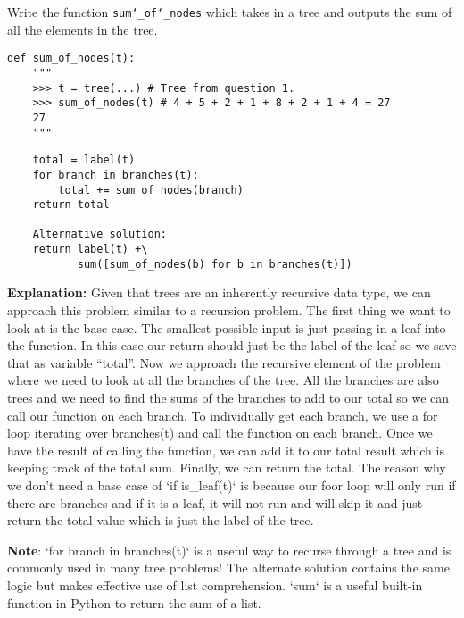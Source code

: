 \begin{blocksection}
\question Write the function \texttt{sum\char`_of\char`_nodes} which takes in a
tree and outputs the sum of all the elements in the tree.
\end{blocksection}

\begin{lstlisting}
def sum_of_nodes(t):
    """
    >>> t = tree(...) # Tree from question 1.
    >>> sum_of_nodes(t) # 4 + 5 + 2 + 1 + 8 + 2 + 1 + 4 = 27
    27
    """
\end{lstlisting}
\begin{solution}
\begin{lstlisting}
    total = label(t)
    for branch in branches(t):
        total += sum_of_nodes(branch)
    return total

    Alternative solution:
    return label(t) +\
           sum([sum_of_nodes(b) for b in branches(t)])
\end{lstlisting}
\textbf{Explanation:}
Given that trees are an inherently recursive data type, we can approach this problem similar to a recursion problem. The first thing we want to look at is the base case. The smallest possible input is just passing in a leaf into the function. In this case our return should just be the label of the leaf so we save that as variable “total”. Now we approach the recursive element of the problem where we need to look at all the branches of the tree. All the branches are also trees and we need to find the sums of the branches to add to our total so we can call our function on each branch. To individually get each branch, we use a for loop iterating over branches(t) and call the function on each branch. Once we have the result of calling the function, we can add it to our total result which is keeping track of the total sum. Finally, we can return the total. The reason why we don’t need a base case of `if is\_leaf(t)` is because our foor loop will only run if there are branches and if it is a leaf, it will not run and will skip it and just return the total value which is just the label of the tree. 

\textbf{Note}: `for branch in branches(t)` is a useful way to recurse through a tree and is commonly used in many tree problems!
The alternate solution contains the same logic but makes effective use of list comprehension. `sum` is a useful built-in function in Python to return the sum of a list.

\end{solution}